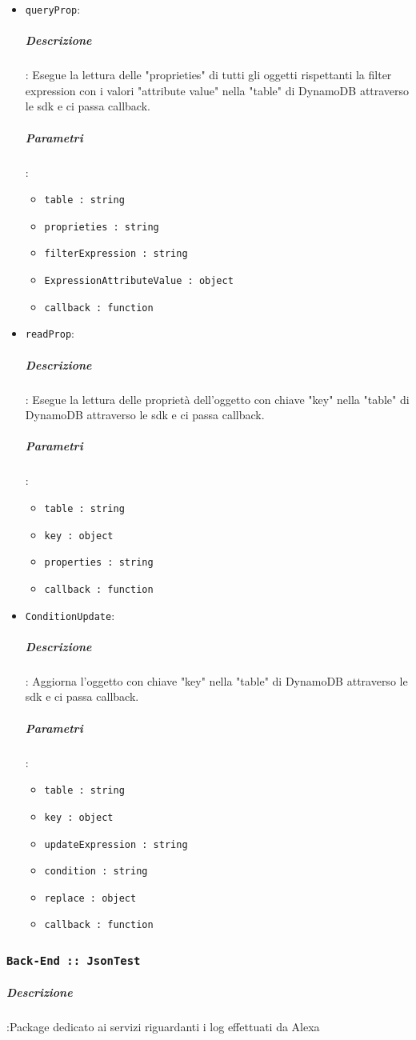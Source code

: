 \documentclass[../DefinizioneDiProdotto_v3.0.0.tex]{subfiles}
\begin{document}
\begin{itemize}
\item \texttt{queryProp}:
\subparagraph{Descrizione}: Esegue la lettura delle "proprieties" di tutti gli oggetti rispettanti la filter expression con i valori "attribute value" nella "table" di DynamoDB attraverso le sdk e ci passa callback.
\subparagraph{Parametri}:
\begin{itemize}
	\item \texttt{table : string}
	\item \texttt{proprieties : string}
	\item \texttt{filterExpression : string}
	\item \texttt{ExpressionAttributeValue : object}
	\item \texttt{callback : function}
\end{itemize}

\item \texttt{readProp}:
\subparagraph{Descrizione}: Esegue la lettura delle proprietà dell'oggetto con chiave "key" nella "table" di DynamoDB attraverso le sdk e ci passa callback.
\subparagraph{Parametri}:
\begin{itemize}
	\item \texttt{table : string}
	\item \texttt{key : object}
	\item \texttt{properties : string}
	\item \texttt{callback : function}
\end{itemize}

\item \texttt{ConditionUpdate}:
\subparagraph{Descrizione}: Aggiorna l'oggetto con chiave "key" nella "table" di DynamoDB attraverso le sdk e ci passa callback.
\subparagraph{Parametri}:
\begin{itemize}
	\item \texttt{table : string}
	\item \texttt{key : object}
	\item \texttt{updateExpression : string}
	\item \texttt{condition : string}
	\item \texttt{replace : object}
	\item \texttt{callback : function}
\end{itemize}

\end{itemize}


\subsubsection{\texttt{Back-End :: JsonTest}}
\subparagraph{Descrizione}:Package dedicato ai servizi riguardanti i log effettuati da Alexa
\end{document}
